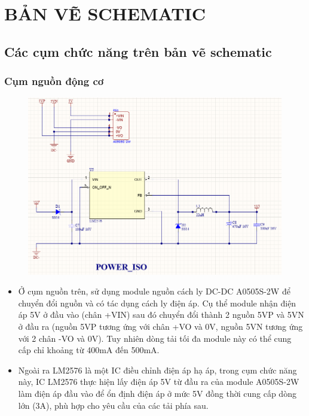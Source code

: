 \chapter{BẢN VẼ SCHEMATIC}
\section{Các cụm chức năng trên bản vẽ schematic}

\subsection{Cụm nguồn động cơ}
\begin{figure}[H]
    \centering
    \includegraphics[width=1\textwidth]{pictures/power_iso.png}
\end{figure}
\begin{itemize}
    \item Ở cụm nguồn trên, sử dụng module nguồn cách ly DC-DC A0505S-2W để chuyển đổi nguồn và có 
    tác dụng cách ly điện áp. Cụ thể module nhận điện áp 5V ở đầu vào (chân +VIN) sau đó chuyển đổi 
    thành 2 nguồn 5VP và 5VN ở đầu ra (nguồn 5VP tương ứng với chân +VO và 0V, nguồn 5VN tương ứng với 2 chân -VO và 0V). Tuy nhiên dòng tải tối đa module này có thể cung cấp chỉ khoảng từ 400mA đến 500mA.
    \item Ngoài ra LM2576 là một IC điều chỉnh điện áp hạ áp, trong cụm chức năng này, IC LM2576 thực hiện lấy điện áp 5V từ đầu ra
    của module A0505S-2W làm điện áp đầu vào để ổn định điện áp ở mức 5V đồng thời cung cấp dòng lớn (3A), phù hợp cho yêu cầu của các tải phía sau.
\end{itemize}

